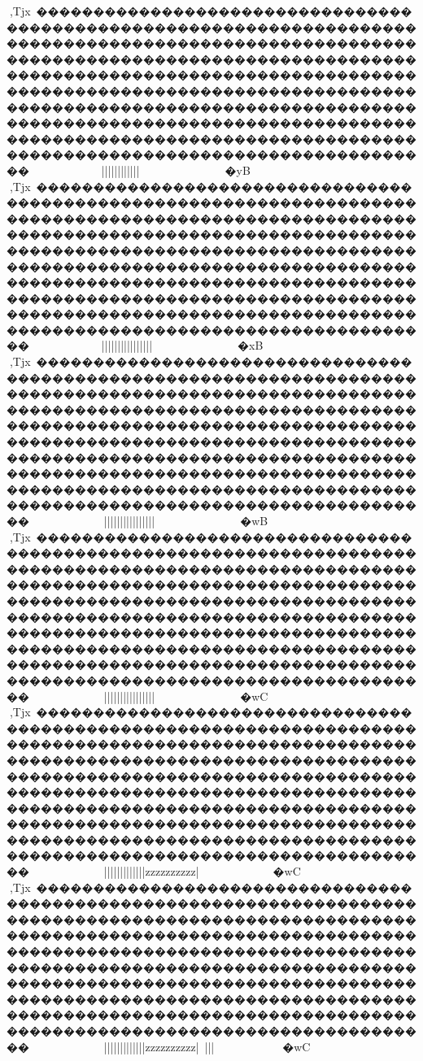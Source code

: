 {{{{{{{{{{{{{{{{{{{{{{{{{{{{{{{{{{{{{{{{{{{{{{{{{{{{{{{{{{{{{{{{{{{{{{{{{{{{{{{{{{{{{{{{{{{{{{{{{{{{{{{{{{{{{{{{{,Tjx~�����������������������������������������������������������������������������������������������������������������������������������������������������������������������������������������������������������������������������������������������������������������������������������������������������������������������������������������������������������������������~~~~~~~~~~~}}}}}||}||||{{{{{{{{{{{{{{{{{{{{{{{{||||{{{{{{{{{{{{{{{{{{{{||}}}~~~}}}}}}}}~~~~~~~~~~~~�yB
,Tjx~�����������������������������������������������������������������������������������������������������������������������������������������������������������������������������������������������������������������������������������������������������������������������������������������������������������������������������������������������������������������������~~~~~~~~~~~}}}}}||}||||{{{{{{{{{{{{{{{{{{{{{{{{||||||||{{{{{{{{{{{{{{{{||}}}~~~}}}}}}}}~~~~~~~~~~~~�xB
,Tjx~�����������������������������������������������������������������������������������������������������������������������������������������������������������������������������������������������������������������������������������������������������������������������������������������������������������������������������������������������������������������������~~~~~~~~~~~~}}}}}||}||||{{{{{{{{{{{{{{{{{{{{{{{{||||||||{{{{{{{{{{{{{{{{||}}}~~~}}}}}}}}~~~~~~~~~~~~�wB
,Tjx~�����������������������������������������������������������������������������������������������������������������������������������������������������������������������������������������������������������������������������������������������������������������������������������������������������������������������������������������������������������������������~~~~~~~~~~~~}}}}}||}||||{{{{{{{{{{{{{{{{{{{{{{{{||||||||{{{{{{{{{{{{{{{{||}}}~~~}}}}}}}}~~~~~~~~~~~~�wC
,Tjx~�����������������������������������������������������������������������������������������������������������������������������������������������������������������������������������������������������������������������������������������������������������������������������������������������������������������������������������������������������������������������~~~~~~~~~~~~}}}}}||}||||{{{{{{{{{{{{{{{{{{{{||||{{{{{{{{|||{{{zzzzzzzzzz{{|}}~}}}}}}}}}}~~~~~~~~~~~~�wC
,Tjx~�����������������������������������������������������������������������������������������������������������������������������������������������������������������������������������������������������������������������������������������������������������������������������������������������������������������������������������������������������������������������~~~~~~~~~~~~}}}}}||}||||{{{{{{{{{{{{{{{{{{{{||||{{{{{{{{|||{{{zzzzzzzzzz{{{|}~}}}|||}}}}~~~~~~~~~~~~�wC
}}}}}}}}}}}}}}}}}}}}}}}}}}}}}}}}}}}}}}}}}}}}}}}}}}}}}}}}}}}}}}}}}}}}}}}}}}}}}}}}}}}}}}}}}}}}}}}}}}}}}}}}}}}}}}}}}}}}}}}}}}}}}}}}}}}}}}}}}}}}}}}}}}}}}}}}}}}}}}}}}}}}}}}}}}}}}}}}}}}}}}}}}}}}}}}}}}}}}}}}}}}}}}}}}}}}}}}}}}}}}}}}}}}}}}}}}}}}}}}}}}}}
